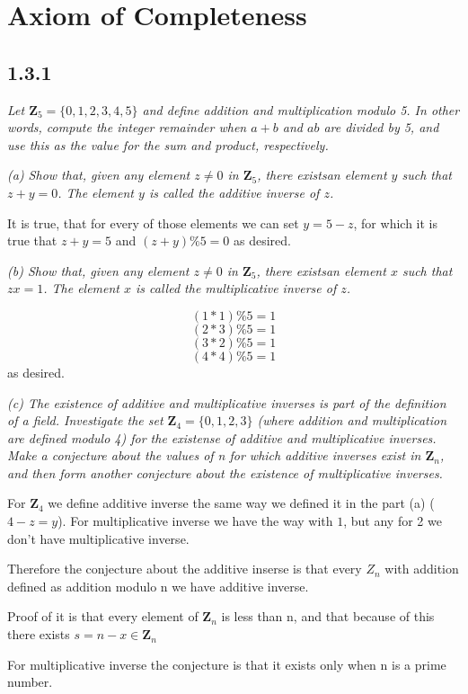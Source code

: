 \documentclass[11pt,oneside,titlepage]{book}
\begin{document}
\section{Axiom of Completeness}

\subsection*{1.3.1}
\textit{Let $\textbf{Z}_5 = \{0, 1, 2, 3, 4, 5\}$ and define addition and
  multiplication modulo 5. In other words, compute the integer remainder when
  $a + b$ and $ab$ are divided by 5, and use this as the value for the sum and
  product, respectively.}

\textit{(a) Show that, given any element $z \neq 0$ in $\textbf{Z}_5$, there
  existsan element $y$ such that $z + y = 0$. The element $y$ is called the
  additive inverse of $z$.}

It is true, that for every of those elements we can set $y = 5 - z$, for which
it is true that $z + y = 5$ and $(z + y)\%5 = 0$ as desired.

\textit{(b) Show that, given any element $z \neq 0$ in $\textbf{Z}_5$, there
  existsan element $x$ such that $zx = 1$. The element $x$ is called the
  multiplicative inverse of $z$.}

$$ (1 * 1) \% 5 = 1 $$
$$ (2 * 3) \% 5 = 1 $$
$$ (3 * 2) \% 5 = 1 $$
$$ (4 * 4) \% 5 = 1 $$
as desired.

\textit{(c) The existence of additive and multiplicative inverses is part of
  the definition of a field. Investigate the set $\textbf{Z}_4 = \{0, 1, 2,
  3\}$ (where addition and multiplication are defined modulo 4) for the
  existense of additive and multiplicative inverses. Make a conjecture about
  the values of n for which additive inverses exist in $\textbf{Z}_n$, and then
  form another conjecture about the existence of multiplicative inverses.}

For $\textbf{Z}_4$ we define additive inverse the same way we defined it
in the  part (a) ($4 - z = y$). For multiplicative inverse we have the way
with $1$, but any for 2 we don't have multiplicative inverse.

Therefore the conjecture about the additive inserse is that every $Z_n$ with
addition defined as addition modulo n we have additive inverse.

Proof of it is that every element of $\textbf{Z}_n$  is less than n, and that
because of this there exists $s = n - x \in \textbf{Z}_n$

For multiplicative inverse the conjecture is that it exists only when
n is a prime number.
\end{document}
